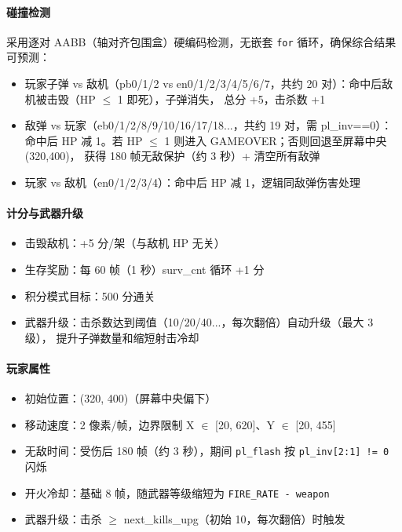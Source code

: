 \documentclass[12pt,a4paper]{ctexart}
\begin{document}
\paragraph{碰撞检测}

采用逐对 AABB（轴对齐包围盒）硬编码检测，无嵌套 \texttt{for} 循环，确保综合结果可预测：

\begin{itemize}
    \item 玩家子弹 vs 敌机（pb0/1/2 vs en0/1/2/3/4/5/6/7，共约 20 对）：命中后敌机被击毁（HP $\le$ 1 即死），子弹消失，
    总分 +5，击杀数 +1
    \item 敌弹 vs 玩家（eb0/1/2/8/9/10/16/17/18...，共约 19 对，需 pl\_inv==0）：
    命中后 HP 减 1。若 HP $\le$ 1 则进入 GAMEOVER；否则回退至屏幕中央 (320,400)，
    获得 180 帧无敌保护（约 3 秒）+ 清空所有敌弹
    \item 玩家 vs 敌机（en0/1/2/3/4）：命中后 HP 减 1，逻辑同敌弹伤害处理
\end{itemize}

\paragraph{计分与武器升级}

\begin{itemize}
    \item 击毁敌机：+5 分/架（与敌机 HP 无关）
    \item 生存奖励：每 60 帧（1 秒）surv\_cnt 循环 +1 分
    \item 积分模式目标：500 分通关
    \item 武器升级：击杀数达到阈值（10/20/40...，每次翻倍）自动升级（最大 3 级），
    提升子弹数量和缩短射击冷却
\end{itemize}

\paragraph{玩家属性}

\begin{itemize}
    \item 初始位置：(320, 400)（屏幕中央偏下）
    \item 移动速度：2 像素/帧，边界限制 X $\in$ [20, 620]、Y $\in$ [20, 455]
    \item 无敌时间：受伤后 180 帧（约 3 秒），期间 \texttt{pl\_flash} 按 \texttt{pl\_inv[2:1] != 0} 闪烁
    \item 开火冷却：基础 8 帧，随武器等级缩短为 \texttt{FIRE\_RATE - weapon}
    \item 武器升级：击杀 $\ge$ next\_kills\_upg（初始 10，每次翻倍）时触发
\end{itemize}
\end{document}
